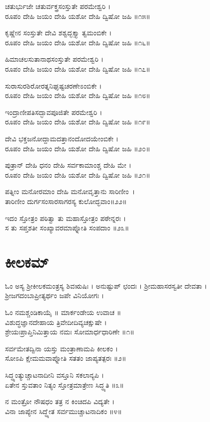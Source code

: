 ಚತುರ್ಭುಜೇ ಚತುರ್ವಕ್ತ್ರಸಂಸ್ತುತೇ ಪರಮೇಶ್ವರಿ ।\\
ರೂಪಂ ದೇಹಿ ಜಯಂ ದೇಹಿ ಯಶೋ ದೇಹಿ ದ್ವಿಷೋ ಜಹಿ ॥೧೫॥

ಕೃಷ್ಣೇನ ಸಂಸ್ತುತೇ ದೇವಿ ಶಶ್ವದ್ಭಕ್ತ್ಯಾ ತ್ವಮಂಬಿಕೇ ।\\
ರೂಪಂ ದೇಹಿ ಜಯಂ ದೇಹಿ ಯಶೋ ದೇಹಿ ದ್ವಿಷೋ ಜಹಿ ॥೧೬॥

ಹಿಮಾಚಲಸುತಾನಾಥಸಂಸ್ತುತೇ ಪರಮೇಶ್ವರಿ ।\\
ರೂಪಂ ದೇಹಿ ಜಯಂ ದೇಹಿ ಯಶೋ ದೇಹಿ ದ್ವಿಷೋ ಜಹಿ ॥೧೭॥

ಸುರಾಸುರಶಿರೋರತ್ನನಿಘೃಷ್ಟಚರಣೇಽಂಬಿಕೇ ।\\
ರೂಪಂ ದೇಹಿ ಜಯಂ ದೇಹಿ ಯಶೋ ದೇಹಿ ದ್ವಿಷೋ ಜಹಿ ॥೧೮॥

ಇಂದ್ರಾಣೀಪತಿಸದ್ಭಾವಪೂಜಿತೇ ಪರಮೇಶ್ವರಿ ।\\
ರೂಪಂ ದೇಹಿ ಜಯಂ ದೇಹಿ ಯಶೋ ದೇಹಿ ದ್ವಿಷೋ ಜಹಿ ॥೧೯॥

ದೇವಿ ಭಕ್ತಜನೋದ್ದಾಮದತ್ತಾನಂದೋದಯೇಂಬಿಕೇ ।\\
ರೂಪಂ ದೇಹಿ ಜಯಂ ದೇಹಿ ಯಶೋ ದೇಹಿ ದ್ವಿಷೋ ಜಹಿ ॥೨೦॥

ಪುತ್ರಾನ್ ದೇಹಿ ಧನಂ ದೇಹಿ ಸರ್ವಕಾಮಾಂಶ್ಚ ದೇಹಿ ಮೇ ।\\
ರೂಪಂ ದೇಹಿ ಜಯಂ ದೇಹಿ ಯಶೋ ದೇಹಿ ದ್ವಿಷೋ ಜಹಿ ॥೨೧॥

ಪತ್ನೀಂ ಮನೋರಮಾಂ ದೇಹಿ ಮನೋವೃತ್ತಾನು ಸಾರಿಣೀಂ~।\\
ತಾರಿಣೀಂ ದುರ್ಗಸಂಸಾರಸಾಗರಸ್ಯ ಕುಲೋದ್ಭವಾಂ॥೨೨॥

ಇದಂ ಸ್ತೋತ್ರಂ ಪಠಿತ್ವಾ ತು ಮಹಾಸ್ತೋತ್ರಂ ಪಠೇನ್ನರಃ ।\\
ಸ ತು ಸಪ್ತಶತೀ ಸಂಖ್ಯಾವರಮಾಪ್ನೋತಿ ಸಂಪದಾಂ ॥೨೩॥
\section{ಕೀಲಕಮ್}
ಓಂ ಅಸ್ಯ ಶ್ರೀಕೀಲಕಮಂತ್ರಸ್ಯ ಶಿವಋಷಿಃ । ಅನುಷ್ಟುಪ್ ಛಂದಃ । ಶ್ರೀಮಹಾಸರಸ್ವತೀ ದೇವತಾ । ಶ್ರೀಜಗದಂಬಾಪ್ರೀತ್ಯರ್ಥಂ ಜಪೇ ವಿನಿಯೋಗಃ ।

ಓಂ ನಮಶ್ಚಂಡಿಕಾಯೈ ॥ ಮಾರ್ಕಂಡೇಯ ಉವಾಚ ॥\\
ವಿಶುದ್ಧಜ್ಞಾನದೇಹಾಯ ತ್ರಿವೇದೀದಿವ್ಯಚಕ್ಷುಷೇ ।\\
ಶ್ರೇಯಃಪ್ರಾಪ್ತಿನಿಮಿತ್ತಾಯ ನಮಃ ಸೋಮಾರ್ಧಧಾರಿಣೇ ॥೧॥

ಸರ್ವಮೇತದ್ವಿನಾ ಯಸ್ತು ಮಂತ್ರಾಣಾಮಪಿ ಕೀಲಕಂ ।\\
ಸೋಽಪಿ ಕ್ಷೇಮಮವಾಪ್ನೋತಿ ಸತತಂ ಜಾಪ್ಯತತ್ಪರಃ ॥೨॥

ಸಿದ್ಧ್ಯಂತ್ಯುಚ್ಚಾಟನಾದೀನಿ ವಸ್ತೂನಿ ಸಕಲಾನ್ಯಪಿ ।\\
ಏತೇನ ಸ್ತುವತಾಂ ನಿತ್ಯಂ ಸ್ತೋತ್ರಮಾತ್ರೇಣ ಸಿದ್ಧ್ಯತಿ ॥೩॥

ನ ಮಂತ್ರೋ ನೌಷಧಂ ತತ್ರ ನ ಕಿಂಚಿದಪಿ ವಿದ್ಯತೇ ।\\
ವಿನಾ ಜಾಪ್ಯೇನ ಸಿದ್ಧ್ಯೇತ ಸರ್ವಮುಚ್ಚಾಟನಾದಿಕಂ ॥೪॥

